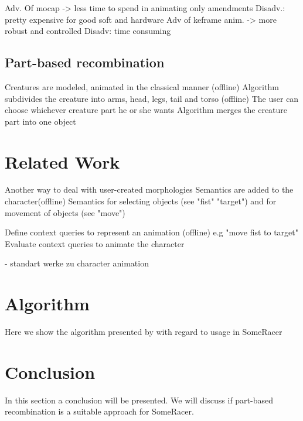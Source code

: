 \documentclass[11pt, a4paper]{article} %
\begin{document}
Adv. Of mocap -> less time to spend in animating only amendments Disadv.: pretty expensive for good soft and hardware
Adv of keframe anim. -> more robust and controlled Disadv: time consuming


\subsection{Part-based recombination}
Creatures are modeled, animated in the classical manner (offline)
Algorithm subdivides the creature into arms, head, legs, tail and torso (offline)
The user can choose whichever creature part he or she wants
Algorithm merges the creature part into one object

\section{Related Work}
Another way to deal with user-created morphologies
Semantics are added to the character(offline)
Semantics for selecting objects (see "fist" "target") and for movement of objects (see "move")

Define context queries to represent an animation (offline)
e.g "move fist to target"
Evaluate context queries to animate the character


- standart werke zu character animation


\section{Algorithm}
Here we show the algorithm presented by \citep{jain2012exploring} with regard to usage in SomeRacer

\section{Conclusion}
In this section a conclusion  will be presented. We will discuss if part-based recombination is a suitable approach for SomeRacer.
\nocite{*}



\end{document}
